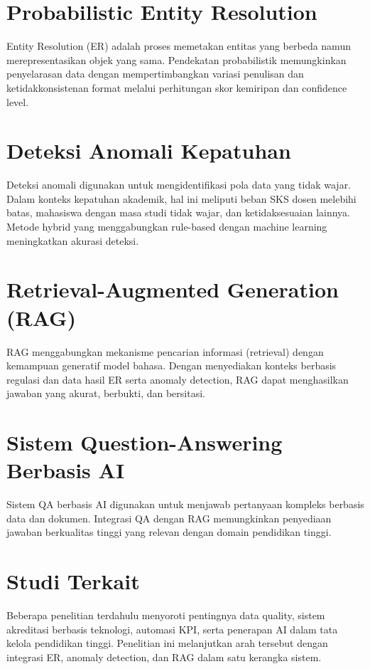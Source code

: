 \documentclass[12pt,a4paper,oneside]{report}
\begin{document}
        \section{Probabilistic Entity Resolution}
        Entity Resolution (ER) adalah proses memetakan entitas yang berbeda namun merepresentasikan objek yang sama. Pendekatan probabilistik memungkinkan penyelarasan data dengan mempertimbangkan variasi penulisan dan ketidakkonsistenan format melalui perhitungan skor kemiripan dan confidence level.


        \section{Deteksi Anomali Kepatuhan}
        Deteksi anomali digunakan untuk mengidentifikasi pola data yang tidak wajar. Dalam konteks kepatuhan akademik, hal ini meliputi beban SKS dosen melebihi batas, mahasiswa dengan masa studi tidak wajar, dan ketidaksesuaian lainnya. Metode hybrid yang menggabungkan rule-based dengan machine learning meningkatkan akurasi deteksi.


        \section{Retrieval-Augmented Generation (RAG)}
        RAG menggabungkan mekanisme pencarian informasi (retrieval) dengan kemampuan generatif model bahasa. Dengan menyediakan konteks berbasis regulasi dan data hasil ER serta anomaly detection, RAG dapat menghasilkan jawaban yang akurat, berbukti, dan bersitasi.


        \section{Sistem Question-Answering Berbasis AI}
        Sistem QA berbasis AI digunakan untuk menjawab pertanyaan kompleks berbasis data dan dokumen. Integrasi QA dengan RAG memungkinkan penyediaan jawaban berkualitas tinggi yang relevan dengan domain pendidikan tinggi.


        \section{Studi Terkait}
        Beberapa penelitian terdahulu menyoroti pentingnya data quality, sistem akreditasi berbasis teknologi, automasi KPI, serta penerapan AI dalam tata kelola pendidikan tinggi. Penelitian ini melanjutkan arah tersebut dengan integrasi ER, anomaly detection, dan RAG dalam satu kerangka sistem.
\end{document}
